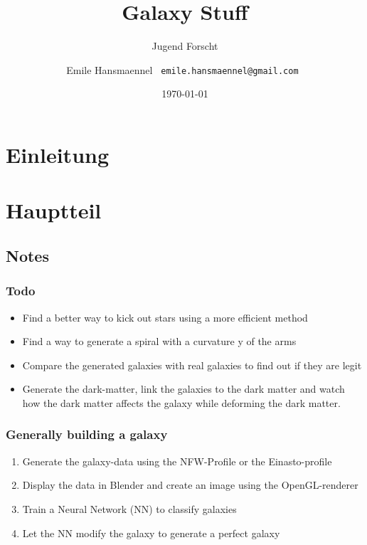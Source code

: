 \documentclass[a4paper,12pt]{scrartcl}
\begin{document}
\title{Galaxy Stuff}
\subtitle{Jugend Forscht \the\year}
\author{ Emile Hansmaennel \texttt{ emile.hansmaennel@gmail.com }}
\date{\today}

\maketitle



\thispagestyle{empty}
\clearpage
\newpage
\setcounter{page}{1}

\tableofcontents
\newpage

\section{Einleitung} \label{Einleitung}

\newpage

\section{Hauptteil} \label{Hauptteil}
\subsection{Notes}

\subsubsection{Todo}

\begin{itemize}
  \item Find a better way to kick out stars using a more efficient method
  \item Find a way to generate a spiral with a curvature y of the arms
  \item Compare the generated galaxies with real galaxies to find out if they
  are legit
  \item Generate the dark-matter, link the galaxies to the dark matter and watch
  how the dark matter affects the galaxy while deforming the dark matter.
\end{itemize}

\subsubsection{Generally building a galaxy}

\begin{enumerate}
  \item Generate the galaxy-data using the NFW-Profile or the Einasto-profile
  \item Display the data in Blender and create an image using the OpenGL-renderer
  \item Train a Neural Network (NN) to classify galaxies
  \item Let the NN modify the galaxy to generate a perfect galaxy
\end{enumerate}
\end{document}
